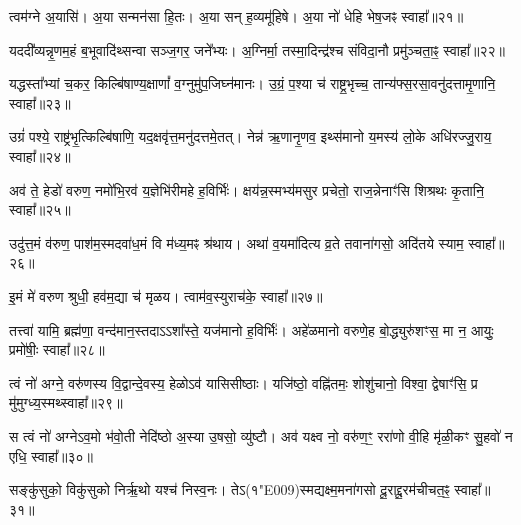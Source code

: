 
त्वम॑ग्ने अ॒यासि॑।
अ॒या सन्मन॑सा हि॒तः।
अ॒या सन् ह॒व्यमू॑हिषे।
अ॒या नो॑ धेहि भेष॒जꣴ स्वाहा᳚॥२१॥



यददी᳚व्यन्नृ॒णम॒हं ब॒भूवादि॑थ्सन्वा सञ्ज॒गर॒ जने᳚भ्यः। 
अ॒ग्निर्मा॒ तस्मा॒दिन्द्र॑श्च संविदा॒नौ प्रमु॑ञ्चता॒ꣴ॒ स्वाहा᳚॥२२॥


यद्धस्ता᳚भ्यां च॒कर॒ किल्बि॑षाण्य॒क्षाणां᳚ व॒ग्नुमु॑प॒जिघ्न॑मानः। 
उ॒ग्रं॒ प॒श्या च॑ राष्ट्र॒भृच्च॒ तान्य॑फ्स॒रसा॒वनु॑दत्तामृ॒णानि॒ स्वाहा᳚॥२३॥



उग्रं॑ पश्ये॒ राष्ट्र॑भृ॒त्किल्बि॑षाणि॒ यद॒क्षवृ॑त्त॒मनु॑दत्तमे॒तत्। 
नेन्न॑ ऋ॒णानृ॒णव॒ इथ्स॑मानो य॒मस्य॑ लो॒के अधि॑रज्जु॒राय॒ स्वाहा᳚॥२४॥



अव॑ ते॒ हेडो॑ वरुण॒ नमो॑\-भि॒रव॑ य॒ज्ञेभि॑रीमहे ह॒विर्भिः॑।
क्षय॑न्न॒स्मभ्य॑मसुर प्रचेतो॒ राज॒न्नेनाꣳ॑सि शिश्रथः कृ॒तानि॒ स्वाहा᳚॥२५॥



उदु॑त्त॒मं व॑रुण॒ पाश॑\-म॒स्मद\-वा॑ध॒मं वि म॑ध्य॒मꣴ श्र॑थाय।
अथा॑ व॒यमा॑दित्य व्र॒ते तवाना॑गसो॒ अदि॑तये स्याम॒ स्वाहा᳚॥२६॥



इ॒मं मे॑ वरुण श्रुधी॒ हव॑म॒द्या च॑ मृळय। त्वाम॑व॒स्युराच॑के॒ स्वाहा᳚॥२७॥


तत्त्वा॑ यामि॒ ब्रह्म॑णा॒ वन्द॑मान॒स्तदाऽऽशा᳚स्ते॒ यज॑मानो ह॒विर्भिः॑।
अहे॑ळमानो वरुणे॒ह बो॒द्ध्युरु॑शꣳस॒ मा न॒ आयुः॒ प्रमो॑षीः॒ स्वाहा᳚॥२८॥




त्वं नो॑ अग्ने॒ वरु॑णस्य वि॒द्वान्दे॒वस्य॒ हेळो\-ऽव॑ यासिसीष्ठाः।
यजि॑ष्ठो॒ वह्नि॑तमः॒ शोशु॑चानो॒ विश्वा॒ द्वेषाꣳ॑सि॒ प्र मु॑मुग्ध्य॒स्मथ्स्वाहा᳚॥२९॥




स त्वं नो॑ अग्ने\-ऽव॒मो भ॑वो॒ती नेदि॑ष्ठो अ॒स्या उ॒षसो॒ व्यु॑ष्टौ।
अव॑ यक्ष्व नो॒ वरु॑ण॒ꣳ॒ ररा॑णो वी॒हि मृ॑ळी॒कꣳ सु॒हवो॑ न एधि॒ स्वाहा᳚॥३०॥



सङ्कु॑सुको॒ विकु॑सुको निर्\mbox{}ऋ॒थो यश्च॑ निस्व॒नः। 
तेऽ(१\char"E009)स्मद्यक्ष्म॒मना॑\-गसो दू॒राद्दू॒रम॑चीचत॒ꣴ॒ स्वाहा᳚॥३१॥

